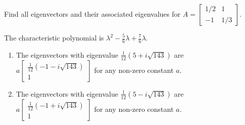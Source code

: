 \documentclass[../main.tex]{subfiles}
\begin{document}
\begin{exercise}
  Find all eigenvectors and their associated eigenvalues for \(A = \begin{bmatrix} 1/2 & 1 \\ -1 & 1/3 \end{bmatrix}\).

  \begin{solution}
    The characteristic polynomial is \(\lambda^{2} - \frac{5}{6} \lambda + \frac{7}{6} \lambda\).


    \begin{enumerate}
      \item The eigenvectors with eigenvalue \(\frac{1}{12}\left( 5 + i \sqrt{143} \right)\) are \(a\begin{bmatrix} \frac{1}{12}\left( -1 - i \sqrt{143} \right) \\ 1 \end{bmatrix}\) for any non-zero constant \(a\).
      \item The eigenvectors with eigenvalue \(\frac{1}{12}\left( 5 - i \sqrt{143} \right)\) are \(a\begin{bmatrix} \frac{1}{12}\left( -1 + i \sqrt{143} \right) \\ 1 \end{bmatrix}\) for any non-zero constant \(a\).
    \end{enumerate}
  \end{solution}
\end{exercise}
\end{document}
